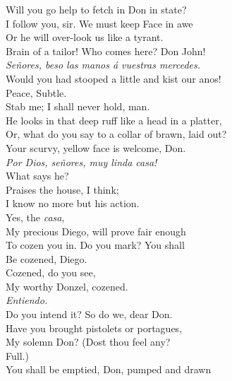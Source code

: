 \documentclass[a4paper,oneside,12pt]{memoir}
\begin{document}
\begin{drama*}
\facespeaks Will you go help to fetch in Don in state?\\
\subtlespeaks I follow you, sir. We must keep Face in awe\\
Or he will over-look us like a tyrant.\\
Brain of a tailor! Who comes here? Don John!\\
\surlyspeaks \emph{Se\~{n}ores, beso las manos \'{a} vuestras mercedes.}\\
\subtlespeaks Would you had stooped a little and kist our anos!\\
\facespeaks Peace, Subtle.\\
\subtlespeaks {} Stab me; I shall never hold, man.\\
He looks in that deep ruff like a head in a platter,\\
\facespeaks Or, what do you say to a collar of brawn, laid out?\\
Your scurvy, yellow  face is welcome, Don.\\
\surlyspeaks \emph{Por Dios, se\~{n}ores, muy linda casa!}\\
\subtlespeaks What says he?\\
\facespeaks {} Praises the house, I think;\\
I know no more but his action.\\
\subtlespeaks {} Yes, the \emph{casa},\\
My precious Diego, will prove fair enough\\
To cozen you in. Do you mark? You shall\\
Be cozened, Diego.\\
\facespeaks {} Cozened, do you see,\\
My worthy Donzel, cozened.\\
\surlyspeaks {} \emph{Entiendo.}\\
\subtlespeaks Do you intend it? So do we, dear Don.\\
Have you brought pistolets or portagues,\\
My solemn Don? (Dost thou feel any?\\
\facespeaks {} Full.)\\
\subtlespeaks You shall be emptied, Don, pumped and drawn\\

\end{drama*}
\end{document}

